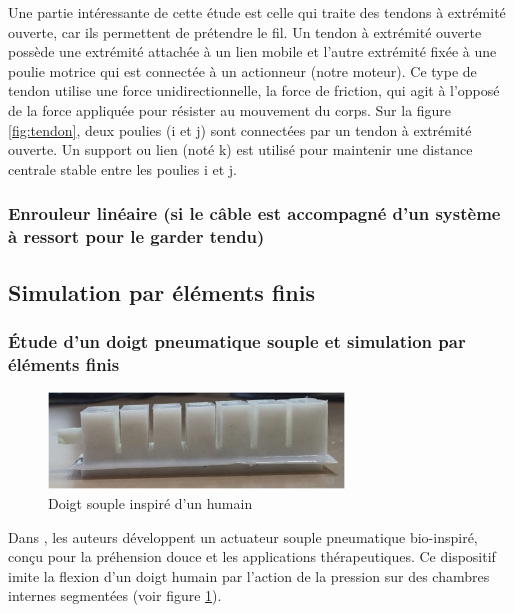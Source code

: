 \documentclass[a4paper, 11pt]{report}
\begin{document}
            Une partie intéressante de cette étude est celle qui traite des tendons à extrémité ouverte, car ils permettent de prétendre le fil. Un tendon à extrémité ouverte possède une extrémité attachée à un lien mobile et l'autre extrémité fixée à une poulie motrice qui est connectée à un actionneur (notre moteur). Ce type de tendon utilise une force unidirectionnelle, la force de friction, qui agit à l'opposé de la force appliquée pour résister au mouvement du corps. Sur la figure \ref{fig:tendon}, deux poulies (i et j) sont connectées par un tendon à extrémité ouverte. Un support ou lien (noté k) est utilisé pour maintenir une distance centrale stable entre les poulies i et j. \cite{saputro_investigation_2023}

        \subsubsection{Enrouleur linéaire (si le câble est accompagné d’un système à ressort pour le garder tendu)}
            

    \subsection{Simulation par éléments finis}

        \subsubsection{Étude d'un doigt pneumatique souple et simulation par éléments finis}

            \begin{figure}
                \centering
                \includegraphics[width=0.7\textwidth]{Figures/doigt_souple.jpg}
                \caption{Doigt souple inspiré d'un humain \cite{bhat_numerical_2025}}
                \label{fig:doigt_souple}
            \end{figure}

            Dans \cite{bhat_numerical_2025}, les auteurs développent un actuateur souple pneumatique bio-inspiré, conçu pour la préhension douce et les applications thérapeutiques. Ce dispositif imite la flexion d’un doigt humain par l'action de la pression sur des chambres internes segmentées (voir figure \ref{fig:doigt_souple}).
\end{document}
